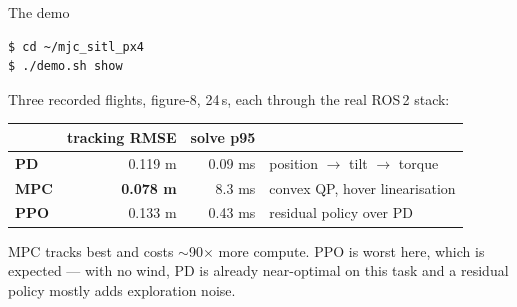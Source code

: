\documentclass[aspectratio=169,11pt]{beamer}
\begin{document}
\begin{frame}[fragile]{The demo}
\begin{lstlisting}
$ cd ~/mjc_sitl_px4
$ ./demo.sh show
\end{lstlisting}

  \vspace{0.3cm}
  Three recorded flights, figure-8, 24\,s, each through the real ROS\,2 stack:

  \vspace{0.25cm}
  \begin{center}
  \small
  \begin{tabular}{@{}lrrl@{}}
    \toprule
    & tracking RMSE & solve p95 & \\
    \midrule
    \textbf{PD}  & 0.119 m & 0.09 ms & position $\to$ tilt $\to$ torque\\
    \textbf{MPC} & \textbf{0.078 m} & 8.3 ms & convex QP, hover linearisation\\
    \textbf{PPO} & 0.133 m & 0.43 ms & residual policy over PD\\
    \bottomrule
  \end{tabular}
  \end{center}

  \vspace{0.3cm}
  {\small MPC tracks best and costs $\sim$90$\times$ more compute. PPO is worst
  here, which is expected --- with no wind, PD is already near-optimal on this
  task and a residual policy mostly adds exploration noise.}
\end{frame}
\end{document}
